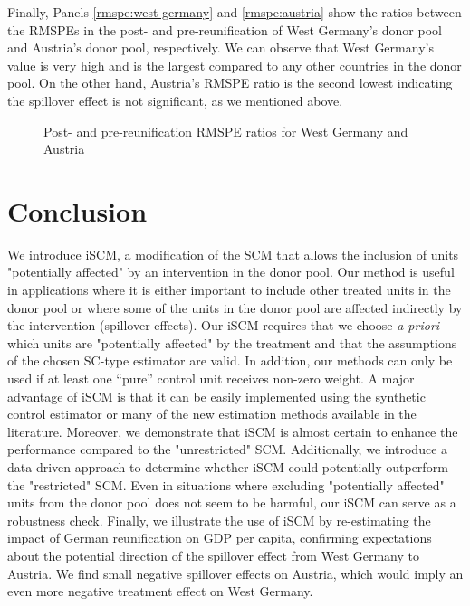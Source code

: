 Finally, Panels \ref{rmspe:west germany} and \ref{rmspe:austria} show the ratios between the RMSPEs in the post- and pre-reunification of West Germany's donor pool and Austria's donor pool, respectively. We can observe that West Germany's value is very high and is the largest compared to any other countries in the donor pool. On the other hand, Austria's RMSPE ratio is the second lowest indicating the spillover effect is not significant, as we mentioned above. 

\begin{figure}[H]
\centering 
{}
\caption{Post- and pre-reunification RMSPE ratios for West Germany and Austria}
\label{rmspe}
\end{figure}


\section{Conclusion}\label{conclusion}
We introduce iSCM, a modification of the  SCM that allows the inclusion of units "potentially affected" by an intervention in the donor pool. Our method is useful in applications where it is either important to include other treated units in the donor pool or where some of the units in the donor pool are affected indirectly by the intervention (spillover effects). Our iSCM requires that we choose \textit{a priori} which units are "potentially affected" by the treatment and that the assumptions of the chosen SC-type estimator are valid.  In addition, our methods can only be used if at least one ``pure'' control unit receives non-zero weight. A major advantage of iSCM is that it can be easily implemented using the synthetic control estimator or many of the new estimation methods available in the literature. 
Moreover, we demonstrate that iSCM is almost certain to enhance the performance compared to the "unrestricted" SCM. Additionally, we introduce a data-driven approach to determine whether iSCM could potentially outperform the "restricted" SCM. Even in situations where excluding "potentially affected" units from the donor pool does not seem to be harmful, our iSCM can serve as a robustness check.
Finally, we illustrate the use of iSCM by re-estimating the impact of German reunification on GDP per capita, confirming \cite{Aba2015} expectations about the potential direction of the spillover effect from West Germany to Austria. We find small negative spillover effects on Austria, which would imply an even more negative treatment effect on West Germany.


